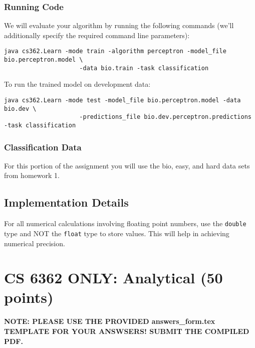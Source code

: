 \documentclass[11pt]{article}
\begin{document}
\subsubsection{Running Code}
We will evaluate your algorithm by running the following commands
(we'll additionally specify the required command line parameters):
\begin{footnotesize}
\begin{verbatim}
java cs362.Learn -mode train -algorithm perceptron -model_file bio.perceptron.model \
                     -data bio.train -task classification
\end{verbatim}
\end{footnotesize}
To run the trained model on development data:
\begin{footnotesize}
\begin{verbatim}
java cs362.Learn -mode test -model_file bio.perceptron.model -data bio.dev \
                     -predictions_file bio.dev.perceptron.predictions -task classification
\end{verbatim}
\end{footnotesize}

\subsubsection{Classification Data}

For this portion of the assignment you will use the bio, easy, and hard data sets from
homework 1.

\subsection{Implementation Details}

For all numerical calculations involving floating point numbers, use the {\tt double} type and NOT the {\tt float} type to store values.
This will help in achieving numerical precision.



\section{CS 6362 ONLY: Analytical (50 points)}

{\bf NOTE: PLEASE USE THE PROVIDED answers\_form.tex TEMPLATE FOR YOUR
ANSWSERS!  SUBMIT THE COMPILED PDF.}
\end{document}
